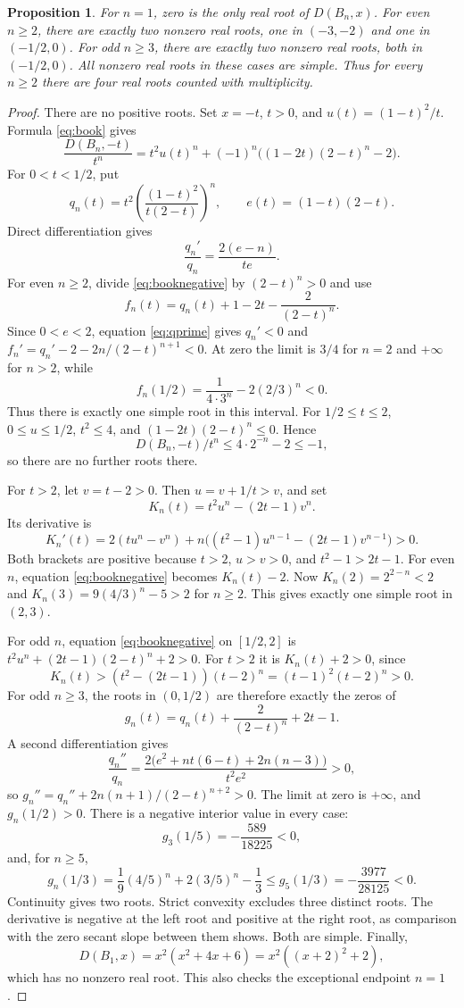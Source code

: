 \documentclass[11pt,a4paper]{article}
\newtheorem{proposition}[theorem]{Proposition}
\begin{document}
\begin{proposition}\label{prop:book}
For $n=1$, zero is the only real root of $D(B_n,x)$.
For even $n\ge2$, there are exactly two nonzero real roots, one in $(-3,-2)$
and one in $(-1/2,0)$. For odd $n\ge3$, there are exactly two nonzero real
roots, both in $(-1/2,0)$. All nonzero real roots in these cases are simple.
Thus for every $n\ge2$ there are four real roots counted with multiplicity.
\end{proposition}
\begin{proof}
There are no positive roots. Set $x=-t$, $t>0$, and
$u(t)=(1-t)^2/t$. Formula \eqref{eq:book} gives
\begin{equation}\label{eq:booknegative}
 \frac{D(B_n,-t)}{t^n}
 =t^2u(t)^n+(-1)^n\big((1-2t)(2-t)^n-2\big).
\end{equation}
For $0<t<1/2$, put
\[
 q_n(t)=t^2\left(\frac{(1-t)^2}{t(2-t)}\right)^n,
 \qquad e(t)=(1-t)(2-t).
\]
Direct differentiation gives
\begin{equation}\label{eq:qprime}
 \frac{q_n'}{q_n}=\frac{2(e-n)}{te}.
\end{equation}
For even $n\ge2$, divide \eqref{eq:booknegative} by $(2-t)^n>0$ and use
\[
 f_n(t)=q_n(t)+1-2t-\frac2{(2-t)^n}.
\]
Since $0<e<2$, equation \eqref{eq:qprime} gives $q_n'<0$ and
$f_n'=q_n'-2-2n/(2-t)^{n+1}<0$.
At zero the limit is $3/4$ for $n=2$ and $+\infty$ for $n>2$, while
\[
 f_n(1/2)=\frac1{4\cdot3^n}-2(2/3)^n<0.
\]
Thus there is exactly one simple root in this interval.
For $1/2\le t\le2$, $0\le u\le1/2$, $t^2\le4$, and
$(1-2t)(2-t)^n\le0$. Hence
\[
 D(B_n,-t)/t^n\le4\cdot2^{-n}-2\le-1,
\]
so there are no further roots there.

For $t>2$, let $v=t-2>0$. Then $u=v+1/t>v$, and set
\[
 K_n(t)=t^2u^n-(2t-1)v^n.
\]
Its derivative is
\[
 K_n'(t)=2(tu^n-v^n)
 +n\big((t^2-1)u^{n-1}-(2t-1)v^{n-1}\big)>0.
\]
Both brackets are positive because $t>2$, $u>v>0$, and $t^2-1>2t-1$.
For even $n$, equation \eqref{eq:booknegative} becomes $K_n(t)-2$.
Now $K_n(2)=2^{2-n}<2$ and $K_n(3)=9(4/3)^n-5>2$ for $n\ge2$.
This gives exactly one simple root in $(2,3)$.

For odd $n$, equation \eqref{eq:booknegative} on $[1/2,2]$ is
$t^2u^n+(2t-1)(2-t)^n+2>0$.
For $t>2$ it is $K_n(t)+2>0$, since
\[
 K_n(t)>(t^2-(2t-1))(t-2)^n=(t-1)^2(t-2)^n>0.
\]
For odd $n\ge3$, the roots in $(0,1/2)$ are therefore exactly the zeros of
\[
 g_n(t)=q_n(t)+\frac2{(2-t)^n}+2t-1.
\]
A second differentiation gives
\[
 \frac{q_n''}{q_n}=
 \frac{2\big(e^2+nt(6-t)+2n(n-3)\big)}{t^2e^2}>0,
\]
so $g_n''=q_n''+2n(n+1)/(2-t)^{n+2}>0$.
The limit at zero is $+\infty$, and $g_n(1/2)>0$.
There is a negative interior value in every case:
\[
 g_3(1/5)=-\frac{589}{18225}<0,
\]
and, for $n\ge5$,
\[
 g_n(1/3)=\frac19(4/5)^n+2(3/5)^n-\frac13
 \le g_5(1/3)=-\frac{3977}{28125}<0.
\]
Continuity gives two roots. Strict convexity excludes three distinct roots.
The derivative is negative at the left root and positive at the right root,
as comparison with the zero secant slope between them shows. Both are simple.
Finally,
\[
 D(B_1,x)=x^2(x^2+4x+6)=x^2((x+2)^2+2),
\]
which has no nonzero real root. This also checks the exceptional endpoint $n=1$.
\end{proof}
\end{document}
